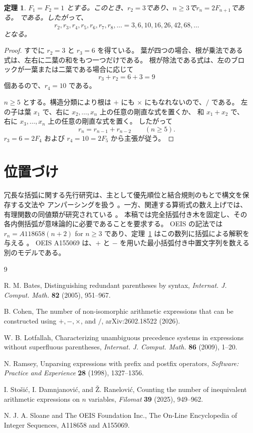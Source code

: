 \documentclass[11pt]{ltjsarticle}
\newtheorem{theorem}{定理}
\begin{document}
\begin{theorem}\label{thm:main}
$F_1=F_2=1$ とする。このとき、$r_2=3$であり、$n\ge3$で$r_n=2F_{n+1}$である。
である。したがって、
\[
 r_2,r_3,r_4,r_5,r_6,r_7,r_8,\ldots
   =3,6,10,16,26,42,68,\ldots
\]
となる。
\end{theorem}

\begin{proof}
すでに $r_2=3$ と $r_3=6$ を得ている。
葉が四つの場合、根が乗法である式は、左右に二葉の和をもつ一つだけである。
根が除法である式は、左のブロックが一葉または二葉である場合に応じて
\[
 r_3+r_2=6+3=9
\]
個あるので、$r_4=10$ である。

$n\ge5$ とする。構造分類により根は $+$ にも $\times$ にもなれないので、$/$ である。
左の子は葉 $x_1$ で、右に $x_2,\ldots,x_n$ 上の任意の剛直な式を置くか、
和 $x_1+x_2$ で、右に $x_3,\ldots,x_n$ 上の任意の剛直な式を置く。
したがって
\[
 r_n=r_{n-1}+r_{n-2}\qquad(n\ge5).
\]
$r_3=6=2F_4$ および $r_4=10=2F_5$ から主張が従う。
\end{proof}

\section*{位置づけ}

冗長な括弧に関する先行研究は、主として優先順位と結合規則のもとで構文を保存する文法や
アンパーシングを扱う \cite{Ramsey,Bates,Lotfallah}。一方、関連する算術式の数え上げでは、
有理関数の同値類が研究されている \cite{StosicDamnjanovicRandelovic,Cohen}。
本稿では完全括弧付き木を固定し、その各内側括弧が意味論的に必要であることを要求する。
OEIS の記法では$ r_n=A118658(n+2)$ for $n\ge3$
であり、定理~\ref{thm:main} はこの数列に括弧による解釈を与える \cite{OEIS}。
OEIS A155069 は、$+$ と $-$ を用いた最小括弧付き中置文字列を数える別のモデルである。

\begin{thebibliography}{9}
\scriptsize
\setlength{\itemsep}{-1pt}

R. M. Bates,
Distinguishing redundant parentheses by syntax,
\emph{Internat. J. Comput. Math.} \textbf{82} (2005), 951--967.

B. Cohen,
The number of non-isomorphic arithmetic expressions that can be constructed
using $+,-,\times$, and $/$,
arXiv:2602.18522 (2026).

W. B. Lotfallah,
Characterizing unambiguous precedence systems in expressions without
superfluous parentheses,
\emph{Internat. J. Comput. Math.} \textbf{86} (2009), 1--20.

N. Ramsey,
Unparsing expressions with prefix and postfix operators,
\emph{Software: Practice and Experience} \textbf{28} (1998), 1327--1356.

I. Sto\v{s}i\'c, I. Damnjanovi\'c, and \v{Z}. Ran{\dj}elovi\'c,
Counting the number of inequivalent arithmetic expressions on $n$ variables,
\emph{Filomat} \textbf{39} (2025), 949--962.

N. J. A. Sloane and The OEIS Foundation Inc.,
The On-Line Encyclopedia of Integer Sequences, A118658 and A155069.

\end{thebibliography}
\end{document}
